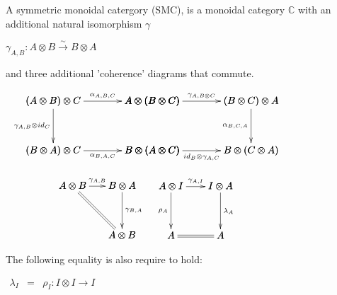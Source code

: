 \begin{definition}
    \label{def:symmetric_monoidal_category}
    A symmetric monoidal catergory (SMC), is a monoidal category $\mathbb{C}$ with an additional natural isomorphism $\gamma$
    \begin{center}
        \begin{math}
            \gamma_{A,B} : A \otimes B \xrightarrow{\sim} B \otimes A
        \end{math}
    \end{center}
    and three additional 'coherence' diagrams that commute.
    \begin{center}
        \begin{math}
            \begin{array}{c}            
                \bfig
                \square|alrb|/->`->``->/<1000,500>[
                    (A \otimes B) \otimes C`
                    A \otimes (B \otimes C)`
                    (B \otimes A) \otimes C`
                    B \otimes (A \otimes C);
                    \alpha_{A,B,C}`
                    \gamma_{A,B} \otimes id_C`
                    `
                    \alpha_{B,A,C}
                ]
                \square(1000,0)|arlb|/->``->`->/<1000,500>[
                    A \otimes (B \otimes C)`
                    (B \otimes C) \otimes A`
                    B \otimes (A \otimes C)`
                    B \otimes (C \otimes A);
                    \gamma_{A,B \otimes C}`
                    `
                    \alpha_{B,C,A}`
                    id_B \otimes \gamma_{A,C}
                ]
                \efig
                \\\\
                \begin{array}{lr}                    
                    \bfig
                    \qtriangle|abr|/->`=`->/[
                        A \otimes B`
                        B \otimes A`
                        A \otimes B;
                        \gamma_{A,B}`
                        `
                        \gamma_{B,A}]
                    \efig
                    &
                    \bfig
                    \square|alrb|/->`->`->`=/[
                        A \otimes I`
                        I \otimes A`
                        A`
                        A;
                        \gamma_{A,I}`
                        \rho_A`
                        \lambda_A`
                        ]
                    \efig                    
                \end{array}
            \end{array}
        \end{math}
    \end{center}
    The following equality is also require to hold:
    \begin{center}
        \begin{math}
            \begin{array}{lcl}
                \lambda_I & = & \rho_I : I \otimes I \rightarrow I
            \end{array}
        \end{math}
    \end{center}
    \cite{bierman1993}
\end{definition}
